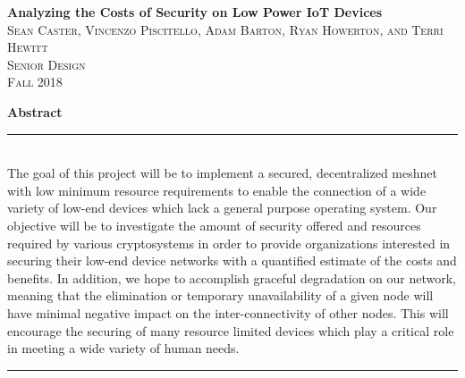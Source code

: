 \documentclass[a4paper,titlepage]{article}
\begin{document}
\begin{titlepage}
\vspace*{\fill}

\newcommand{\HRule}{\rule{\linewidth}{0.5mm}} %

\center %


{ \huge \bfseries Analyzing the Costs of Security on Low Power IoT Devices}\\[0.4cm] %


\textsc{\LARGE Sean Caster, Vincenzo Piscitello, Adam Barton, Ryan Howerton, and Terri Hewitt}\\[0.5cm] %
\textsc{\Large Senior Design}\\[0.5cm] %
\textsc{\large Fall 2018}\\[2.5cm] %


\begin{minipage}{0.8\textwidth}  %
\textbf{\large Abstract} \\
\HRule \\[0.4cm]
The goal of this project will be to implement a secured, decentralized meshnet with low minimum resource requirements to enable the connection of a wide variety of low-end devices which lack a general purpose operating system. Our objective will be to investigate the amount of security offered and resources required by various cryptosystems in order to provide organizations interested in securing their low-end device networks with a quantified estimate of the costs and benefits. In addition, we hope to accomplish graceful degradation on our network, meaning that the elimination or temporary unavailability of a given node will have minimal negative impact on the inter-connectivity of other nodes. This will encourage the securing of many resource limited devices which play a critical role in meeting a wide variety of human needs.
\\[0.4cm]
\HRule \\[1.5cm]
\end{minipage}


\end{titlepage}
\end{document}
